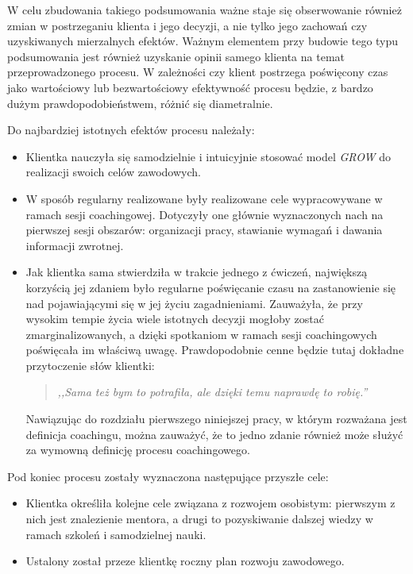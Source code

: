 W celu zbudowania takiego podsumowania ważne staje się obserwowanie również zmian w postrzeganiu klienta i jego decyzji, a nie tylko jego zachowań
czy uzyskiwanych mierzalnych efektów. Ważnym elementem przy budowie tego typu podsumowania jest również uzyskanie opinii samego klienta na temat
przeprowadzonego procesu. W zależności czy klient postrzega poświęcony czas jako wartościowy lub bezwartościowy efektywność procesu będzie,
z bardzo dużym prawdopodobieństwem, różnić się diametralnie.

Do najbardziej istotnych efektów procesu należały:
\begin{itemize}
  \item Klientka nauczyła się samodzielnie i intuicyjnie stosować model \emph{GROW} do realizacji swoich celów zawodowych.
  \item W sposób regularny realizowane były realizowane cele wypracowywane w ramach sesji coachingowej. Dotyczyły one głównie wyznaczonych nach na
      pierwszej sesji obszarów: organizacji pracy, stawianie wymagań i dawania informacji zwrotnej.
  \item Jak klientka sama stwierdziła w trakcie jednego z ćwiczeń, największą korzyścią jej zdaniem było regularne poświęcanie czasu na zastanowienie
      się nad pojawiającymi się w jej życiu zagadnieniami. Zauważyła, że przy wysokim tempie życia wiele istotnych decyzji mogłoby zostać zmarginalizowanych,
      a dzięki spotkaniom w ramach sesji coachingowych poświęcała im właściwą uwagę. Prawdopodobnie cenne będzie tutaj dokładne przytoczenie słów klientki:
      \begin{quote}
      \centering
      \emph{,,Sama też bym to potrafiła, ale dzięki temu naprawdę to robię.''}
      \end{quote}
      Nawiązując do rozdziału pierwszego niniejszej pracy, w którym rozważana jest definicja coachingu, można zauważyć, że to jedno zdanie również
      może służyć za wymowną definicję procesu coachingowego.
\end{itemize}

Pod koniec procesu zostały wyznaczona następujące przyszłe cele:
\begin{itemize}
  \item Klientka określiła kolejne cele związana z rozwojem osobistym: pierwszym z nich jest znalezienie mentora, a drugi to pozyskiwanie dalszej wiedzy
      w ramach szkoleń i samodzielnej nauki.
  \item Ustalony został przeze klientkę roczny plan rozwoju zawodowego.
\end{itemize}

